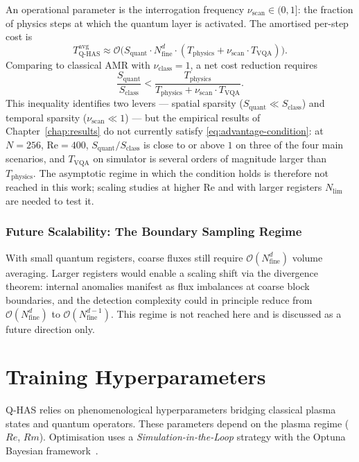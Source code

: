 \documentclass[12pt, a4paper, oneside]{report}
\begin{document}
An operational parameter is the interrogation frequency $\nu_{\text{scan}} \in (0,1]$: the fraction of physics steps at which the quantum layer is activated. The amortised per-step cost is
\begin{equation}
    T_{\text{Q-HAS}}^{\text{avg}} \approx \mathcal{O}\bigl(S_{\text{quant}} \cdot N_{\text{fine}}^d \cdot (T_{\text{physics}} + \nu_{\text{scan}} \cdot T_{\text{VQA}})\bigr).
\end{equation}
Comparing to classical AMR with $\nu_{\text{class}} = 1$, a net cost reduction requires
\begin{equation}
    \frac{S_{\text{quant}}}{S_{\text{class}}} < \frac{T_{\text{physics}}}{T_{\text{physics}} + \nu_{\text{scan}} \cdot T_{\text{VQA}}}.
    \label{eq:advantage-condition}
\end{equation}
This inequality identifies two levers --- spatial sparsity ($S_{\text{quant}} \ll S_{\text{class}}$) and temporal sparsity ($\nu_{\text{scan}} \ll 1$) --- but the empirical results of Chapter~\ref{chap:results} do not currently satisfy \eqref{eq:advantage-condition}: at $N = 256$, $\mathrm{Re} = 400$, $S_{\text{quant}}/S_{\text{class}}$ is close to or above $1$ on three of the four main scenarios, and $T_{\text{VQA}}$ on simulator is several orders of magnitude larger than $T_{\text{physics}}$. The asymptotic regime in which the condition holds is therefore not reached in this work; scaling studies at higher $\mathrm{Re}$ and with larger registers $N_{\text{lim}}$ are needed to test it.

\subsection*{Future Scalability: The Boundary Sampling Regime}
With small quantum registers, coarse fluxes still require $\mathcal{O}(N_{\text{fine}}^d)$ volume averaging. Larger registers would enable a scaling shift via the divergence theorem: internal anomalies manifest as flux imbalances at coarse block boundaries, and the detection complexity could in principle reduce from $\mathcal{O}(N_{\text{fine}}^d)$ to $\mathcal{O}(N_{\text{fine}}^{d-1})$. This regime is not reached here and is discussed as a future direction only.


\chapter{Training Hyperparameters}
\label{chap:training}

Q-HAS relies on phenomenological hyperparameters bridging classical plasma states and quantum operators. These parameters depend on the plasma regime ($Re$, $Rm$). Optimisation uses a \textit{Simulation-in-the-Loop} strategy with the Optuna Bayesian framework~\cite{akiba2019}.
\end{document}
